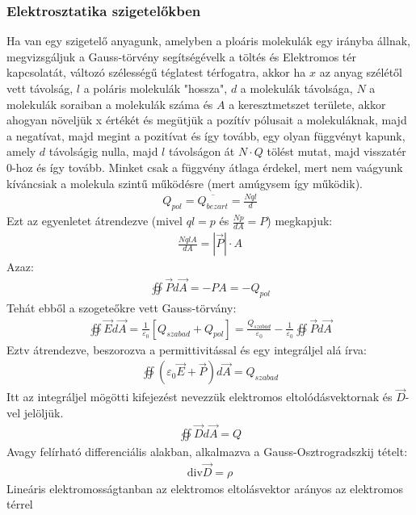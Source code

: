 \documentclass{article}
\begin{document}
\subsubsection{Elektrosztatika szigetelőkben}
Ha van egy szigetelő anyagunk, amelyben a ploáris molekulák egy irányba állnak, megvizsgáljuk a Gauss-törvény segítségévelk a töltés és Elektromos tér kapcsolatát, változó szélességű téglatest térfogatra, akkor ha $x$ az anyag szélétől vett távolság, $l$ a poláris molekulák "hossza", $d$ a molekulák távolsága, $N$ a molekulák soraiban a molekulák száma és $A$ a keresztmetszet területe, akkor ahogyan növeljük x értékét és megütjük a pozítív pólusait a molekuláknak, majd a negatívat, majd megint a pozitívat és így tovább, egy olyan függvényt kapunk, amely $d$ távolságig nulla, majd $l$ távolságon át $N\cdot Q$ tölést mutat, majd visszatér 0-hoz és így tovább. Minket csak a függvény átlaga érdekel, mert nem vaágyunk kíváncsiak a molekula szintű működésre (mert amúgysem így működik). 
\begin{gather*}
Q_{pol} = \overline{Q_{bezart}} = \frac{Nql}{d}
\end{gather*} 
Ezt az egyenletet átrendezve (mivel $ql=p$ és $\frac{Np}{dA}=P$) megkapjuk:
\begin{gather*}
\frac{NqlA}{dA}=|\vec{P}| \cdot A
\end{gather*}
Azaz:
\begin{gather*}
\oiint \vec{P} d\vec{A} = -PA = -Q_{pol}
\end{gather*}
Tehát ebből a szogeteőkre vett Gauss-törvány:
\begin{gather*}
\oiint \vec{E} d\vec{A} = \frac{1}{ \varepsilon_0} [Q_{szabad} + Q_{pol}] = \frac{Q_{szabad}}{\varepsilon_0} - \frac{1}{\varepsilon_0} \oiint \vec{P} d\vec{A}
\end{gather*}
Eztv átrendezve, beszorozva a permittivitással és egy integráljel alá írva:
\begin{gather*}
\oiint (\varepsilon_0 \vec{E} + \vec{P}) d\vec{A} = Q_{szabad}
\end{gather*}
Itt az integráljel mögötti kifejezést nevezzük elektromos eltolódásvektornak és $\vec{D}$-vel jelöljük.
\begin{gather*}
\boxed{\oiint \vec{D} d\vec{A} = Q}
\end{gather*}
Avagy felírható differenciális alakban, alkalmazva a Gauss-Osztrogradszkij tételt:
\begin{gather*}
\mathrm{div}\vec{D} = \rho
\end{gather*}
Lineáris elektromosságtanban az elektromos eltolásvektor arányos az elektromos térrel
\end{document}
